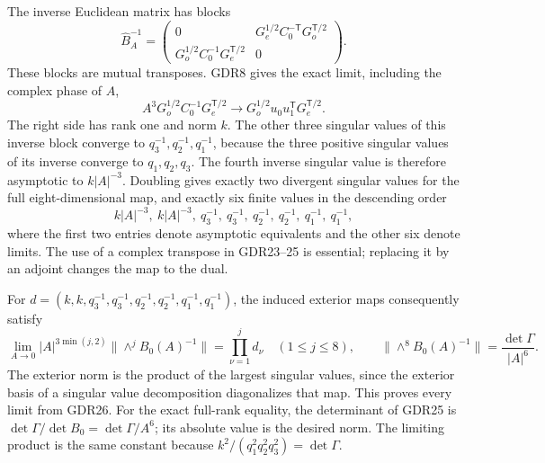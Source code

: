\documentclass[11pt]{article}
\begin{document}
The inverse Euclidean matrix has blocks
\begin{equation}
 \widehat B_A^{-1}=
 \begin{pmatrix}
 0&G_e^{1/2}C_0^{-\mathsf T}G_o^{\mathsf T/2}\\
 G_o^{1/2}C_0^{-1}G_e^{\mathsf T/2}&0
 \end{pmatrix}.
 \tag{GDR25}
\end{equation}
These blocks are mutual transposes. GDR8 gives the exact
limit, including the complex phase of $A$,
\[
 A^3G_o^{1/2}C_0^{-1}G_e^{\mathsf T/2}
 \longrightarrow G_o^{1/2}u_0u_1^{\mathsf T}G_e^{\mathsf T/2}.
\]
The right side has rank one and norm $k$. The other three
singular values of this inverse block converge to
$q_3^{-1},q_2^{-1},q_1^{-1}$, because the three positive
singular values of its inverse converge to $q_1,q_2,q_3$.
The fourth inverse singular value is therefore asymptotic
to $k|A|^{-3}$. Doubling gives exactly two divergent singular
values for the full eight-dimensional map, and exactly six
finite values in the descending order
\begin{equation}
 k|A|^{-3},\ k|A|^{-3},\
 q_3^{-1},\ q_3^{-1},\ q_2^{-1},\ q_2^{-1},\ q_1^{-1},\ q_1^{-1},
 \tag{GDR26}
\end{equation}
where the first two entries denote asymptotic equivalents
and the other six denote limits. The use of a complex
transpose in GDR23--25 is essential; replacing it by an
adjoint changes the map to the dual.

For $d=(k,k,q_3^{-1},q_3^{-1},q_2^{-1},q_2^{-1},q_1^{-1},q_1^{-1})$,
the induced exterior maps consequently satisfy
\begin{equation}
 \lim_{A\to0}|A|^{3\min(j,2)}
       \|\wedge^j B_0(A)^{-1}\|
   =\prod_{\nu=1}^j d_\nu\quad(1\le j\le8),\qquad
 \|\wedge^8 B_0(A)^{-1}\|
       =\frac{\det\Gamma}{|A|^6}.
 \tag{GDR27}
\end{equation}
The exterior norm is the product of the largest singular
values, since the exterior basis of a singular value
decomposition diagonalizes that map. This proves every
limit from GDR26. For the exact full-rank equality, the
determinant of GDR25 is
$\det\Gamma/\det B_0=\det\Gamma/A^6$; its absolute value
is the desired norm. The limiting product is the same
constant because $k^2/(q_1^2q_2^2q_3^2)=\det\Gamma$.
\end{document}

